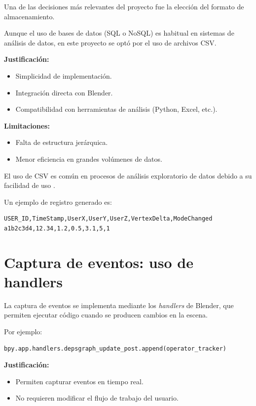 Una de las decisiones más relevantes del proyecto fue la elección del formato de almacenamiento.

Aunque el uso de bases de datos (SQL o NoSQL) es habitual en sistemas de análisis de datos, en este proyecto se optó por el uso de archivos CSV.

\textbf{Justificación:}
\begin{itemize}
    \item Simplicidad de implementación.
    \item Integración directa con Blender.
    \item Compatibilidad con herramientas de análisis (Python, Excel, etc.).
\end{itemize}

\textbf{Limitaciones:}
\begin{itemize}
    \item Falta de estructura jerárquica.
    \item Menor eficiencia en grandes volúmenes de datos.
\end{itemize}

El uso de CSV es común en procesos de análisis exploratorio de datos debido a su facilidad de uso \cite{data_analysis}.

Un ejemplo de registro generado es:

\begin{verbatim}
USER_ID,TimeStamp,UserX,UserY,UserZ,VertexDelta,ModeChanged
a1b2c3d4,12.34,1.2,0.5,3.1,5,1
\end{verbatim}

\section{Captura de eventos: uso de handlers}

La captura de eventos se implementa mediante los \textit{handlers} de Blender, que permiten ejecutar código cuando se producen cambios en la escena.

Por ejemplo:

\begin{verbatim}
bpy.app.handlers.depsgraph_update_post.append(operator_tracker)
\end{verbatim}

\textbf{Justificación:}
\begin{itemize}
    \item Permiten capturar eventos en tiempo real.
    \item No requieren modificar el flujo de trabajo del usuario.
\end{itemize}

